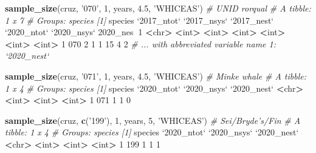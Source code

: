 \documentclass[
]{book}
\newenvironment{Shaded}{\begin{snugshade}}{\end{snugshade}}
\newcommand{\CommentTok}[1]{\textcolor[rgb]{0.56,0.35,0.01}{\textit{#1}}}
\newcommand{\DataTypeTok}[1]{\textcolor[rgb]{0.13,0.29,0.53}{#1}}
\newcommand{\DecValTok}[1]{\textcolor[rgb]{0.00,0.00,0.81}{#1}}
\newcommand{\ErrorTok}[1]{\textcolor[rgb]{0.64,0.00,0.00}{\textbf{#1}}}
\newcommand{\FloatTok}[1]{\textcolor[rgb]{0.00,0.00,0.81}{#1}}
\newcommand{\KeywordTok}[1]{\textcolor[rgb]{0.13,0.29,0.53}{\textbf{#1}}}
\newcommand{\NormalTok}[1]{#1}
\newcommand{\OperatorTok}[1]{\textcolor[rgb]{0.81,0.36,0.00}{\textbf{#1}}}
\newcommand{\StringTok}[1]{\textcolor[rgb]{0.31,0.60,0.02}{#1}}
\begin{document}
\begin{Shaded}
\begin{Highlighting}[]
\KeywordTok{sample_size}\NormalTok{(cruz, }\StringTok{'070'}\NormalTok{, }\DecValTok{1}\NormalTok{, years, }\FloatTok{4.5}\NormalTok{, }\StringTok{'WHICEAS'}\NormalTok{) }\CommentTok{# UNID rorqual}
\CommentTok{# A tibble: 1 x 7}
\CommentTok{# Groups:   species [1]}
\NormalTok{  species }\StringTok{`}\DataTypeTok{2017_ntot}\StringTok{`} \StringTok{`}\DataTypeTok{2017_nsys}\StringTok{`} \StringTok{`}\DataTypeTok{2017_nest}\StringTok{`} \StringTok{`}\DataTypeTok{2020_ntot}\StringTok{`} \StringTok{`}\DataTypeTok{2020_nsys}\StringTok{`} \DecValTok{2020}\NormalTok{_nes}\OperatorTok{~}\DecValTok{1}
  \OperatorTok{<}\NormalTok{chr}\OperatorTok{>}\StringTok{         }\ErrorTok{<}\NormalTok{int}\OperatorTok{>}\StringTok{       }\ErrorTok{<}\NormalTok{int}\OperatorTok{>}\StringTok{       }\ErrorTok{<}\NormalTok{int}\OperatorTok{>}\StringTok{       }\ErrorTok{<}\NormalTok{int}\OperatorTok{>}\StringTok{       }\ErrorTok{<}\NormalTok{int}\OperatorTok{>}\StringTok{      }\ErrorTok{<}\NormalTok{int}\OperatorTok{>}
\DecValTok{1} \DecValTok{070}               \DecValTok{2}           \DecValTok{1}           \DecValTok{1}          \DecValTok{15}           \DecValTok{4}          \DecValTok{2}
\CommentTok{# ... with abbreviated variable name 1: `2020_nest`}

\KeywordTok{sample_size}\NormalTok{(cruz, }\StringTok{'071'}\NormalTok{, }\DecValTok{1}\NormalTok{, years, }\FloatTok{4.5}\NormalTok{, }\StringTok{'WHICEAS'}\NormalTok{) }\CommentTok{# Minke whale}
\CommentTok{# A tibble: 1 x 4}
\CommentTok{# Groups:   species [1]}
\NormalTok{  species }\StringTok{`}\DataTypeTok{2020_ntot}\StringTok{`} \StringTok{`}\DataTypeTok{2020_nsys}\StringTok{`} \StringTok{`}\DataTypeTok{2020_nest}\StringTok{`}
  \OperatorTok{<}\NormalTok{chr}\OperatorTok{>}\StringTok{         }\ErrorTok{<}\NormalTok{int}\OperatorTok{>}\StringTok{       }\ErrorTok{<}\NormalTok{int}\OperatorTok{>}\StringTok{       }\ErrorTok{<}\NormalTok{int}\OperatorTok{>}
\DecValTok{1} \DecValTok{071}               \DecValTok{1}           \DecValTok{1}           \DecValTok{0}

\KeywordTok{sample_size}\NormalTok{(cruz, }\KeywordTok{c}\NormalTok{(}\StringTok{'199'}\NormalTok{), }
            \DecValTok{1}\NormalTok{, years, }\DecValTok{5}\NormalTok{, }\StringTok{'WHICEAS'}\NormalTok{) }\CommentTok{# Sei/Bryde's/Fin}
\CommentTok{# A tibble: 1 x 4}
\CommentTok{# Groups:   species [1]}
\NormalTok{  species }\StringTok{`}\DataTypeTok{2020_ntot}\StringTok{`} \StringTok{`}\DataTypeTok{2020_nsys}\StringTok{`} \StringTok{`}\DataTypeTok{2020_nest}\StringTok{`}
  \OperatorTok{<}\NormalTok{chr}\OperatorTok{>}\StringTok{         }\ErrorTok{<}\NormalTok{int}\OperatorTok{>}\StringTok{       }\ErrorTok{<}\NormalTok{int}\OperatorTok{>}\StringTok{       }\ErrorTok{<}\NormalTok{int}\OperatorTok{>}
\DecValTok{1} \DecValTok{199}               \DecValTok{1}           \DecValTok{1}           \DecValTok{1}


\end{Highlighting}
\end{Shaded}
\end{document}
